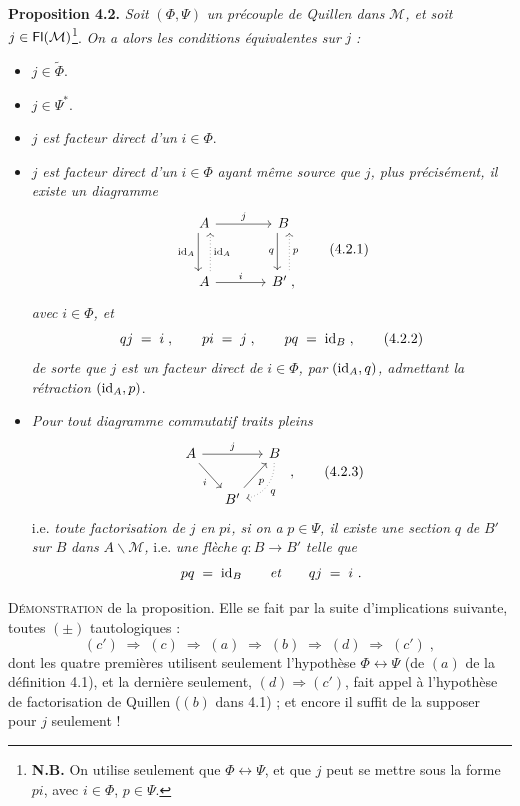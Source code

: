 \textbf{Proposition 4.2.} \textit{Soit} $(\Phi,\Psi)$ \textit{un précouple de Quillen dans} $\mathcal{M}$\textit{, et soit} $j\in\mathsf{Fl}(\mathcal{M})$\footnote[9]{\textbf{N.B.} On utilise seulement que $\Phi\longleftrightarrow\Psi$, et que $j$ peut se mettre sous la forme $pi$, avec $i\in\Phi$, $p\in\Psi$.}. %
\textit{On a alors les conditions équivalentes sur} $j$ \textit{:}
\begin{itemize}[leftmargin=2.5em]
\item[a)] $j\in\widetilde{\Phi}$.
\item[b)] $j\in\Psi^*$.
\item[c)] $j$ \textit{est facteur direct d'un} $i\in\Phi$.
\item[c$'$)] $j$ \textit{est facteur direct d'un} $i\in\Phi$ \textit{ayant même source que} $j$\textit{, plus précisément, il existe un diagramme}
\[
\begin{tikzcd}[row sep=large, column sep=large]
A \arrow[r, "j"] \arrow[d, shift right=1ex, "\id_A"'] & B \arrow[d, shift right=1ex, "q"'] \\
A \arrow[u, dotted, shift right=1ex, "\id_A"'] \arrow[r, "i"] & B' \;, \arrow[u, dotted, shift right=1ex, "p"']
\end{tikzcd}
\tag*{(4.2.1)}
\]
\textit{avec} $i\in\Phi$\textit{, et}
\[
qj \;=\; i\;, \qquad pi \;=\; j\;, \qquad pq \;=\; \id_B\;,
\tag*{(4.2.2)}
\]
\textit{de sorte que} $j$ \textit{est un facteur direct de} $i\in\Phi$\textit{, par} $(\mathrm{id}_A,q)$\textit{, admettant la rétraction} $(\mathrm{id}_A,p)$.
\item[d)] \textit{Pour tout diagramme commutatif traits pleins}
\[
\begin{tikzcd}[column sep=small]
A \arrow[rr, "j"] \arrow[dr, "i"'] & & B \arrow[dl, dotted, bend left=40, "q"] \\
& B' \arrow[ur, "p"'] &
\end{tikzcd}
\;,
\tag*{(4.2.3)}
\]
i.e. \textit{toute factorisation de} $j$ \textit{en} $pi$\textit{, si on a} $p\in\Psi$\textit{, il existe une section} $q$ \textit{de} $B'$ \textit{sur} $B$ \textit{dans} $A\backslash\mathcal{M}$\textit{,} i.e. \textit{une flèche} $q:B\longrightarrow B'$ \textit{telle que}
\[
pq \;=\; \mathrm{id}_B \qquad \textit{et} \qquad qj \;=\; i\ .
\]
\end{itemize}

\textsc{Démonstration} de la proposition. Elle se fait par la suite d'implications suivante, toutes $(\pm)$ tautologiques :
\[
(c') \;\Longrightarrow\; (c) \;\Longrightarrow\; (a) \;\Longrightarrow\; (b) \;\Longrightarrow\; (d) \;\Longrightarrow\; (c')\;,
\]
dont les quatre premières utilisent seulement l'hypothèse $\Phi\longleftrightarrow\Psi$ (de $(a)$ de la définition 4.1), et la dernière seulement, $(d)\Longrightarrow(c')$, fait appel à l'hypothèse de factorisation de Quillen ($(b)$ dans 4.1) ; et encore il suffit de la supposer pour $j$ seulement !

